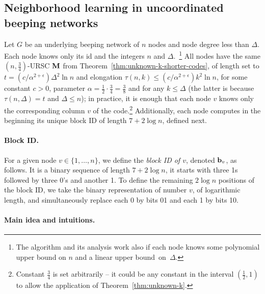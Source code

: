 \documentclass[11pt]{article}
\begin{document}
\subsection{Neighborhood learning in uncoordinated beeping networks}

Let $G$ be an underlying beeping network of $n$ nodes and node degree less than $\Delta$. 
Each node knows only its id and the integers $n$ and $\Delta$.~\footnote{The algorithm and its analysis work also if each node knows some polynomial upper bound on $n$ and a linear upper bound~on~$\Delta$.}
All nodes have the same $(n, \frac{3}{4})$-URSC ${\mathbf M}$ from Theorem~\ref{thm:unknown-k-shorter-codes}, of length set to $t=(c/\alpha^{2+\epsilon}) \Delta^2 \ln n$ and elongation $\tau(n,k) \le (c/\alpha^{2+\epsilon}) k^2 \ln n$, for some constant $c>0$, parameter $\alpha = \frac{1}{2} \cdot \frac{3}{4} = \frac{3}{8}$ and for any $k\le \Delta$ (the latter is because $\tau(n,\Delta)=t$ and $\Delta\le n$); in practice, it is enough that each node $v$ knows only the corresponding column $v$ of the code.\footnote{Constant $\frac{3}{4}$ is set arbitrarily -- it could be any constant in the interval $(\frac{1}{2},1)$ to allow 
the application of Theorem~\ref{thm:unknown-k}.}
Additionally, each node computes in the beginning its unique block ID of length 
$7+2\log n$, defined next.

\paragraph{Block ID.}
For a given node $v\in \{1,\ldots,n\}$, we define the {\em block ID of $v$}, denoted
${\mathbf b}_v$, as follows. It is a binary sequence of length $7+2\log n$, it starts with three 1s followed by three 0's and another 1.
To define the remaining $2\log n$ positions of the block ID, we take the binary representation of number $v$, of logarithmic length, and simultaneously replace each 0 by bits 01 and each 1 by bits 10. 

\paragraph{Main idea and intuitions.}
\end{document}
